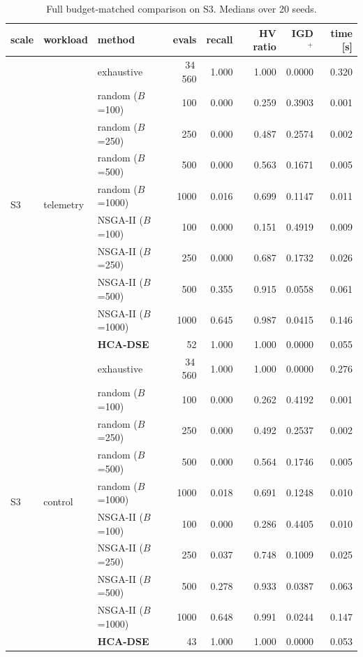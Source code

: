 \documentclass[pdflatex,sn-nature]{sn-jnl}
\theoremstyle{thmstyleone}
\theoremstyle{thmstyletwo}
\theoremstyle{thmstylethree}
\begin{document}
\begin{table}[!htbp]\centering
\caption{Full budget-matched comparison on S3. Medians over 20 seeds.}\label{tabS2}
{\let\scriptsize\tiny\setlength{\tabcolsep}{2pt}\scriptsize
\begin{tabular}{lllrrrrr}
\toprule
scale & workload & method & evals & recall & HV ratio & IGD$^{+}$ & time [s] \\
\midrule
\multirow{10}{*}{S3} & \multirow{10}{*}{telemetry} & exhaustive & 34\,560 & 1.000 & 1.000 & 0.0000 & 0.320 \\
 & & random ($B$=100) & 100 & 0.000 & 0.259 & 0.3903 & 0.001 \\
 & & random ($B$=250) & 250 & 0.000 & 0.487 & 0.2574 & 0.002 \\
 & & random ($B$=500) & 500 & 0.000 & 0.563 & 0.1671 & 0.005 \\
 & & random ($B$=1000) & 1000 & 0.016 & 0.699 & 0.1147 & 0.011 \\
 & & NSGA-II ($B$=100) & 100 & 0.000 & 0.151 & 0.4919 & 0.009 \\
 & & NSGA-II ($B$=250) & 250 & 0.000 & 0.687 & 0.1732 & 0.026 \\
 & & NSGA-II ($B$=500) & 500 & 0.355 & 0.915 & 0.0558 & 0.061 \\
 & & NSGA-II ($B$=1000) & 1000 & 0.645 & 0.987 & 0.0415 & 0.146 \\
 & & \textbf{HCA-DSE} & 52 & 1.000 & 1.000 & 0.0000 & 0.055 \\
\midrule
\multirow{10}{*}{S3} & \multirow{10}{*}{control} & exhaustive & 34\,560 & 1.000 & 1.000 & 0.0000 & 0.276 \\
 & & random ($B$=100) & 100 & 0.000 & 0.262 & 0.4192 & 0.001 \\
 & & random ($B$=250) & 250 & 0.000 & 0.492 & 0.2537 & 0.002 \\
 & & random ($B$=500) & 500 & 0.000 & 0.564 & 0.1746 & 0.005 \\
 & & random ($B$=1000) & 1000 & 0.018 & 0.691 & 0.1248 & 0.010 \\
 & & NSGA-II ($B$=100) & 100 & 0.000 & 0.286 & 0.4405 & 0.010 \\
 & & NSGA-II ($B$=250) & 250 & 0.037 & 0.748 & 0.1009 & 0.025 \\
 & & NSGA-II ($B$=500) & 500 & 0.278 & 0.933 & 0.0387 & 0.063 \\
 & & NSGA-II ($B$=1000) & 1000 & 0.648 & 0.991 & 0.0244 & 0.147 \\
 & & \textbf{HCA-DSE} & 43 & 1.000 & 1.000 & 0.0000 & 0.053 \\

\end{tabular}}
\end{table}
\end{document}
